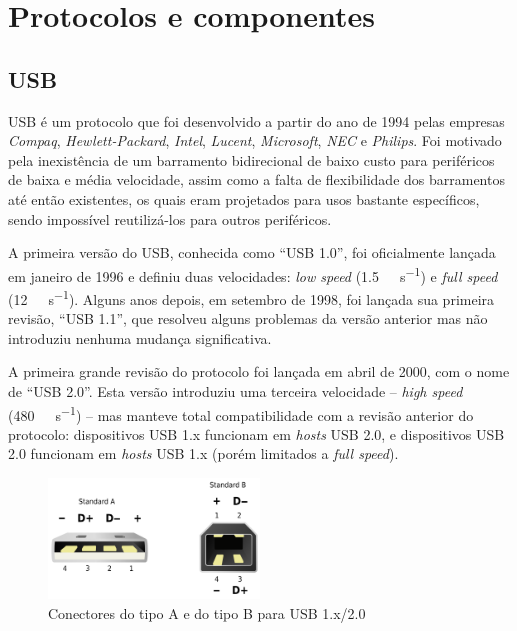 \documentclass[brazil,pagestart=firstchapter]{abnt}
\begin{document}
\chapter{Protocolos e componentes\label{cap:protocolos_e_componentes}}

\section{USB\label{sec:usb}}

\ac{USB} é um protocolo que foi desenvolvido a partir do ano de 1994 pelas
empresas \textit{Compaq}, \textit{Hewlett-Packard}, \textit{Intel},
\textit{Lucent}, \textit{Microsoft}, \textit{NEC} e \textit{Philips}. Foi
motivado pela inexistência de um barramento bidirecional de baixo custo para
periféricos de baixa e média velocidade, assim como a falta de flexibilidade
dos barramentos até então existentes, os quais eram projetados para usos
bastante específicos, sendo impossível reutilizá-los para outros
periféricos. \cite{usb20}

A primeira versão do \ac{USB}, conhecida como ``USB 1.0'', foi oficialmente
lançada em janeiro de 1996 e definiu duas velocidades: \textit{low speed}
(\SI{1.5}{\mega\bit\per\second}) e \textit{full speed}
(\SI{12}{\mega\bit\per\second}). Alguns anos depois, em setembro de 1998, foi
lançada sua primeira revisão, ``USB 1.1'', que resolveu alguns problemas da
versão anterior mas não introduziu nenhuma mudança significativa.

A primeira grande revisão do protocolo foi lançada em abril de 2000, com o
nome de ``USB 2.0''. Esta versão introduziu uma terceira velocidade --
\textit{high speed} (\SI{480}{\mega\bit\per\second}) -- mas manteve total
compatibilidade com a revisão anterior do protocolo: dispositivos USB 1.x
funcionam em \textit{hosts} USB 2.0, e dispositivos USB 2.0 funcionam em
\textit{hosts} USB 1.x (porém limitados a \textit{full speed}).

\begin{figure}[h]
\centering
\includegraphics[width=0.5\textwidth]{img/USB.png}
\caption{Conectores do tipo A e do tipo B para USB 1.x/2.0}
\label{fig:usb_connectors}
\end{figure}
\end{document}

